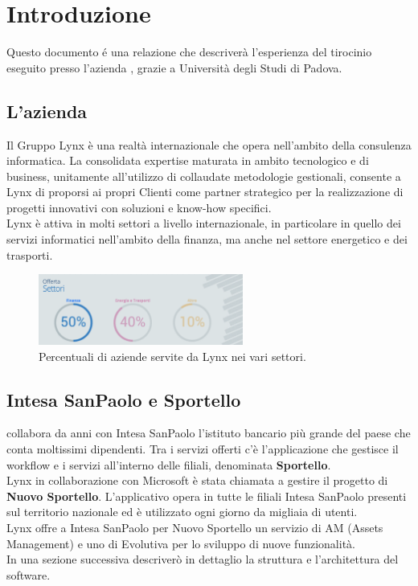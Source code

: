 \section{Introduzione}
Questo documento é una relazione che descriverà l'esperienza del tirocinio eseguito presso l'azienda \azienda, grazie a Università degli Studi di Padova.


\subsection{L'azienda}
Il Gruppo Lynx è una realtà internazionale che opera nell'ambito della consulenza informatica. La consolidata expertise maturata in ambito tecnologico e di business, unitamente all'utilizzo di collaudate metodologie gestionali, consente a Lynx di proporsi ai propri Clienti come partner strategico per la realizzazione di progetti innovativi con soluzioni e know-how specifici. \\
Lynx è attiva in molti settori a livello internazionale, in particolare in quello dei servizi informatici nell'ambito della finanza, ma anche nel settore energetico e dei trasporti. \\

\begin{figure}[!ht]
	\centering
	\includegraphics[width=0.6\textwidth]{./res/img/settori.png}
	\caption{Percentuali di aziende servite da Lynx nei vari settori.}
\end{figure}

\subsection{Intesa SanPaolo e Sportello}
\azienda  collabora da anni con Intesa SanPaolo l'istituto bancario più grande del paese che conta moltissimi dipendenti. Tra i servizi offerti c'è l'applicazione che gestisce il workflow e i servizi all'interno delle filiali, denominata \textbf{Sportello}. \\
Lynx in collaborazione con Microsoft è stata chiamata a gestire il progetto di \textbf{Nuovo Sportello}. L'applicativo opera in tutte le filiali Intesa SanPaolo presenti sul territorio nazionale ed è utilizzato ogni giorno da migliaia di utenti. \\
Lynx offre a Intesa SanPaolo per Nuovo Sportello un servizio di AM (Assets Management) e uno di Evolutiva per lo sviluppo di nuove funzionalità. \\
In una sezione successiva descriverò in dettaglio la struttura e l'architettura del software. \\

